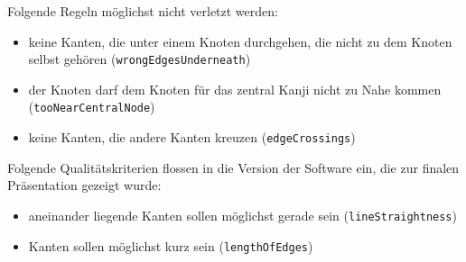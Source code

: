 Folgende Regeln möglichst nicht verletzt werden:

\begin{itemize}
\item
  keine Kanten, die unter einem Knoten durchgehen, die nicht zu dem
  Knoten selbst gehören (\texttt{wrongEdgesUnderneath})
\item
  der Knoten darf dem Knoten für das zentral Kanji nicht zu Nahe kommen
  (\texttt{tooNearCentralNode})
\item
  keine Kanten, die andere Kanten kreuzen (\texttt{edgeCrossings})
\end{itemize}

Folgende Qualitätskriterien flossen in die Version der Software ein, die
zur finalen Präsentation gezeigt wurde:

\begin{itemize}
\item
  aneinander liegende Kanten sollen möglichst gerade sein
  (\texttt{lineStraightness})
\item
  Kanten sollen möglichst kurz sein (\texttt{lengthOfEdges})
\end{itemize}
